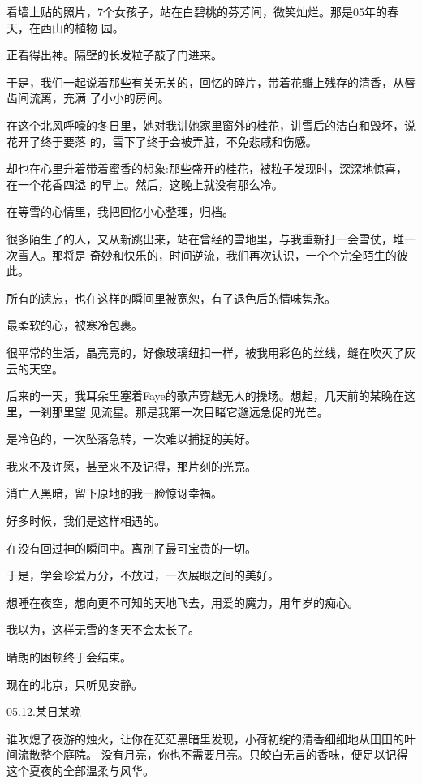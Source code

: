 		看墙上贴的照片，7个女孩子，站在白碧桃的芬芳间，微笑灿烂。那是05年的春天，在西山的植物
	园。

		正看得出神。隔壁的长发粒子敲了门进来。

		于是，我们一起说着那些有关无关的，回忆的碎片，带着花瓣上残存的清香，从唇齿间流离，充满
	了小小的房间。

		在这个北风呼嚎的冬日里，她对我讲她家里窗外的桂花，讲雪后的洁白和毁坏，说花开了终于要落
	的，雪下了终于会被弄脏，不免悲戚和伤感。

		却也在心里升着带着蜜香的想象:那些盛开的桂花，被粒子发现时，深深地惊喜，在一个花香四溢
	的早上。然后，这晚上就没有那么冷。

		在等雪的心情里，我把回忆小心整理，归档。

		很多陌生了的人，又从新跳出来，站在曾经的雪地里，与我重新打一会雪仗，堆一次雪人。那将是
	奇妙和快乐的，时间逆流，我们再次认识，一个个完全陌生的彼此。

		所有的遗忘，也在这样的瞬间里被宽恕，有了退色后的情味隽永。\par
		最柔软的心，被寒冷包裹。\par
		很平常的生活，晶亮亮的，好像玻璃纽扣一样，被我用彩色的丝线，缝在吹灭了灰云的天空。


		后来的一天，我耳朵里塞着Faye的歌声穿越无人的操场。想起，几天前的某晚在这里，一刹那里望
	见流星。那是我第一次目睹它邈远急促的光芒。

		是冷色的，一次坠落急转，一次难以捕捉的美好。\par
		我来不及许愿，甚至来不及记得，那片刻的光亮。\par
		消亡入黑暗，留下原地的我一脸惊讶幸福。\par
		好多时候，我们是这样相遇的。\par
		在没有回过神的瞬间中。离别了最可宝贵的一切。\par
		于是，学会珍爱万分，不放过，一次展眼之间的美好。


		想睡在夜空，想向更不可知的天地飞去，用爱的魔力，用年岁的痴心。


		我以为，这样无雪的冬天不会太长了。\par
		晴朗的困顿终于会结束。


		现在的北京，只听见安静。

		05.12.某日某晚

	\endwriting



		谁吹熄了夜游的烛火，让你在茫茫黑暗里发现，小荷初绽的清香细细地从田田的叶间流散整个庭院。
	没有月亮，你也不需要月亮。只皎白无言的香味，便足以记得这个夏夜的全部温柔与风华。


